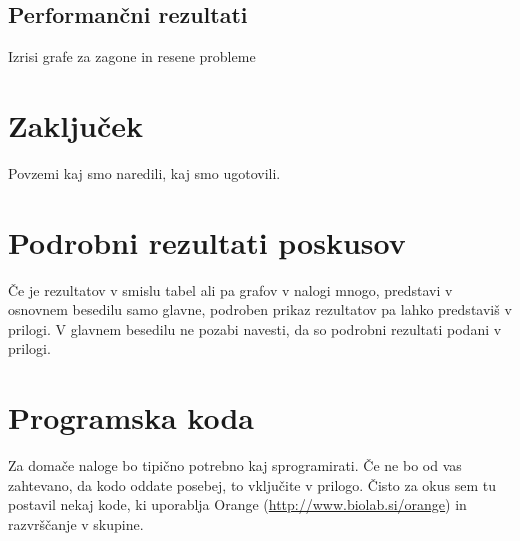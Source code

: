 \documentclass[a4paper,11pt]{article}
\begin{document}
\subsection{Performančni rezultati}
Izrisi grafe za zagone in resene probleme

\section{Zaključek}
Povzemi kaj smo naredili, kaj smo ugotovili.

\appendix
\appendixpage
\section{\label{app-res}Podrobni rezultati poskusov}

Če je rezultatov v smislu tabel ali pa grafov v nalogi mnogo,
predstavi v osnovnem besedilu samo glavne, podroben prikaz
rezultatov pa lahko predstaviš v prilogi. V glavnem besedilu ne
pozabi navesti, da so podrobni rezultati podani v prilogi.

\section{\label{app-code}Programska koda}

Za domače naloge bo tipično potrebno kaj sprogramirati. Če ne bo od
vas zahtevano, da kodo oddate posebej, to vključite v prilogo. Čisto
za okus sem tu postavil nekaj kode, ki uporablja Orange
(\url{http://www.biolab.si/orange}) in razvrščanje v skupine.




\end{document}
